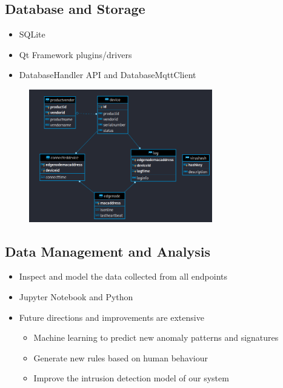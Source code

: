 \subsection{Database and Storage}
\begin{frame}{\insertsubsection}
    \begin{itemize}
        \item SQLite
        \item Qt Framework plugins/drivers
        \item DatabaseHandler API and DatabaseMqttClient
    \end{itemize}
    
    \begin{figure}[h]
        \centering
        \includegraphics[width=8cm]{img/database_ERdiagram.png}
        \label{fig:db_erdiagram}
    \end{figure}
\end{frame}



\subsection{Data Management and Analysis}
\begin{frame}{\insertsubsection}
    \begin{itemize}
        \item Inspect and model the data collected from all endpoints
        \item Jupyter Notebook and Python
        \vspace{0.5cm}
        \item Future directions and improvements are extensive
        \begin{itemize}
            \item Machine learning to predict new anomaly patterns and signatures
            \item Generate new rules based on human behaviour
            \item Improve the intrusion detection model of our system
        \end{itemize}
    \end{itemize}
\end{frame}

